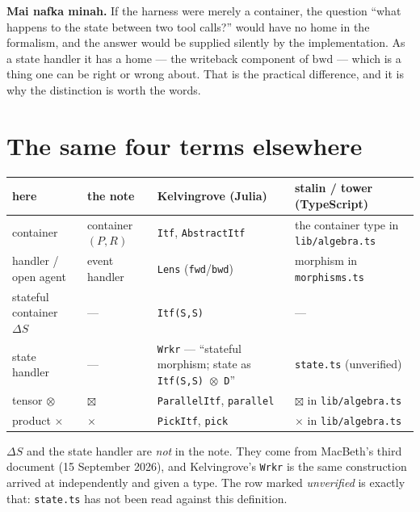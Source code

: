 \documentclass[11pt,a4paper]{article}
\newcommand{\code}[1]{\texttt{\small #1}}
\begin{document}
\medskip
\noindent\textbf{Mai nafka minah.} If the harness were merely a container, the question ``what
happens to the state between two tool calls?'' would have no home in the formalism, and the answer
would be supplied silently by the implementation. As a state handler it has a home --- the
writeback component of $\mathrm{bwd}$ --- which is a thing one can be right or wrong about. That is
the practical difference, and it is why the distinction is worth the words.

\section{The same four terms elsewhere}

\begin{center}\footnotesize
\begin{tabular}{@{}l>{\raggedright\arraybackslash}p{28mm}>{\raggedright\arraybackslash}p{52mm}>{\raggedright\arraybackslash}p{38mm}@{}}
\toprule
\textbf{here} & \textbf{the note} & \textbf{Kelvingrove (Julia)} & \textbf{stalin / tower (TypeScript)}\\
\midrule
container & container $(P,R)$ & \code{Itf}, \code{AbstractItf} & the container type in \code{lib/algebra.ts}\\
handler / open agent & event handler & \code{Lens} (\code{fwd}/\code{bwd}) & morphism in \code{morphisms.ts}\\
stateful container $\Delta S$ & --- & \code{Itf(S,S)} & ---\\
state handler & --- & \code{Wrkr} --- ``stateful morphism; state as \code{Itf(S,S) $\otimes$ D}'' & \code{state.ts} (unverified)\\
tensor $\otimes$ & $\boxtimes$ & \code{ParallelItf}, \code{parallel} & $\boxtimes$ in \code{lib/algebra.ts}\\
product $\times$ & $\times$ & \code{PickItf}, \code{pick} & $\times$ in \code{lib/algebra.ts}\\
\bottomrule
\end{tabular}
\end{center}

\medskip
\noindent\small
$\Delta S$ and the state handler are \emph{not} in the note. They come from MacBeth's third
document (15 September 2026), and Kelvingrove's \code{Wrkr} is the same construction arrived at
independently and given a type. The row marked \emph{unverified} is exactly that: \code{state.ts}
has not been read against this definition.

\end{document}
